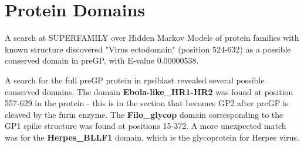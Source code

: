 \documentclass[a4paper,12pt]{article}
\begin{document}
\section{Protein Domains}
A search at SUPERFAMILY over Hidden Markov Models of protein families with known structure discovered "Virus ectodomain" (position 524-632) as a possible conserved domain in preGP, with E-value 0.00000538. \cite{pmid11697912}

A search for the full preGP protein in rpsiblast revealed several possible conserved domains. The domain \textbf{Ebola-like\_HR1-HR2} was found at position 557-629 in the protein - this is in the section that becomes GP2 after preGP is cleaved by the furin enzyme. The \textbf{Filo\_glycop} domain corresponding to the GP1 spike structure was found at positions 15-372. A more unexpected match was for the \textbf{Herpes\_BLLF1} domain, which is the glycoprotein for Herpes virus. 



\end{document}
